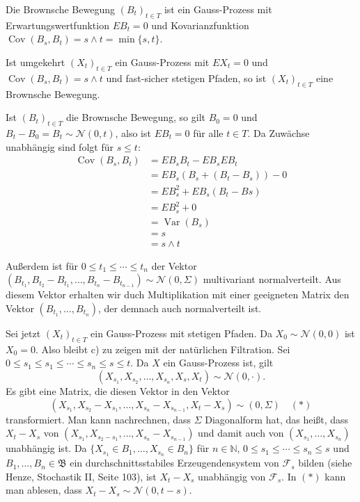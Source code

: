 \documentclass[a4paper,twoside,DIV15,BCOR12mm]{scrbook}
\newcommand{\cF}{\mathcal F}
\newcommand{\borel}{{\mathfrak B}}
\begin{document}
\begin{satz}
\label{satz:9.2}
Die Brownsche Bewegung $(B_t)_{t\in T}$ ist ein Gauss-Prozess mit Erwartungswertfunktion $EB_t =0$ und Kovarianzfunktion $\operatorname{Cov}(B_s,B_t)=s\wedge t = \min\{s,t\}$.

Ist umgekehrt $(X_t)_{t\in T}$ ein Gauss-Prozess mit $EX_t=0$ und $\operatorname{Cov}(B_s,B_t)=s\wedge t$ und fast-sicher stetigen Pfaden, so ist $(X_t)_{t\in T}$ eine Brownsche Bewegung.
\end{satz}

\begin{beweis}
Ist $(B_t)_{t\in T}$ die Brownsche Bewegung, so gilt $B_0=0$ und $B_t-B_0=B_t\sim \mathcal N(0,t)$, also ist $EB_t=0$ für alle $t\in T$. Da Zuwächse unabhängig sind folgt für $s\le t$:
\begin{align*}
\operatorname{Cov}(B_s,B_t) &= EB_sB_t - EB_sEB_t\\
&= EB_s(B_s + (B_t-B_s)) - 0\\
&= EB_s^2 + EB_s(B_t-Bs) \\
&= EB_s^2 + 0 \\
&= \operatorname{Var}(B_s)  \\
&= s \\
&= s\wedge t
\end{align*}

Außerdem ist für $0\le t_1\le\cdots\le t_n$ der Vektor $(B_{t_1},B_{t_2}-B_{t_1},\ldots,B_{t_n}-B_{t_{n-1}})\sim \mathcal N(0,\Sigma)$ multivariant normalverteilt. Aus diesem Vektor erhalten wir duch Multiplikation mit einer geeigneten Matrix den Vektor $(B_{t_1},\ldots,B_{t_n})$, der demnach auch normalverteilt ist.

Sei jetzt $(X_t)_{t\in T}$ ein Gauss-Prozess mit stetigen Pfaden. Da $X_0\sim \mathcal N(0,0)$ ist $X_0=0$. Also bleibt c) zu zeigen mit der natürlichen Filtration. Sei $0\le s_1\le s_1\le \cdots \le s_n\le s \le t$. Da $X$ ein Gauss-Prozess ist, gilt 
\[
(X_{s_1},X_{s_2},\ldots,X_{s_n},X_s,X_t)\sim \mathcal N(0,\cdot).
\]
Es gibt eine Matrix, die diesen Vektor in den Vektor 
\[
(X_{s_1},X_{s_2}-X_{s_1},\ldots,X_{s_n}-X_{s_{n-1}},X_t-X_s)\sim(0,\Sigma) \quad (*)
\]
transformiert. Man kann nachrechnen, dass $\Sigma$ Diagonalform hat, das heißt, dass $X_t -X_s$ von $(X_{s_1},X_{s_2-s_1},\ldots,X_{s_n}-X_{s_{n-1}})$ und damit auch von $(X_{s_1},\ldots,X_{s_n})$ unabhängig ist. Da $\{X_{s_1}\in B_1,\ldots,X_{s_n}\in B_n\}$ für $n\in \mathbb N$, $0\le s_1\le \cdots\le s_n\le s$ und $B_1,\ldots,B_n\in \borel$ ein durchschnittsstabiles Erzeugendensystem von $\cF_s$ bilden (siehe Henze, Stochastik II, Seite 103), ist $X_t-X_s$ unabhängig von $\cF_s$. In $(*)$ kann man ablesen, dass $X_t-X_s\sim \mathcal N(0,t-s)$.
\end{beweis}
\end{document}
